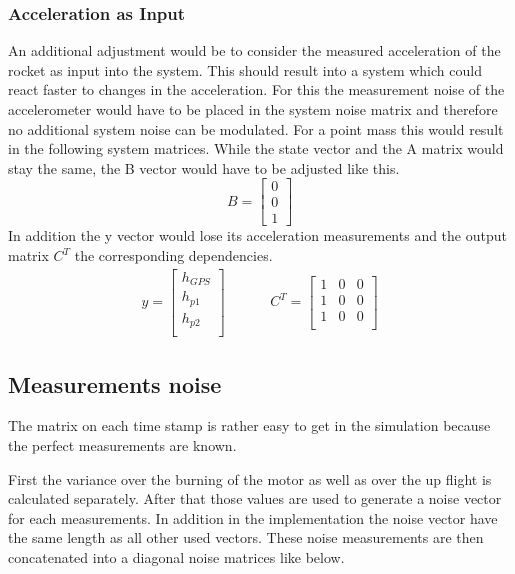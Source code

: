 \subsubsection{Acceleration as Input}
An additional adjustment would be to consider the measured acceleration of the rocket as input into the system.
This should result into a system which could react faster to changes in the acceleration.
For this the measurement noise of the accelerometer would have to be placed in the system noise matrix 
and therefore no additional system noise can be modulated.
For a point mass this would result in the following system matrices.
While the state vector and the A matrix would stay the same, the B vector would have to be adjusted like this.
$$ B = \begin{bmatrix}
        0 \\
        0 \\
        1
       \end{bmatrix}
$$
In addition the y vector would lose its acceleration measurements and the output matrix $C^T$ the corresponding dependencies.
\begin{align*}
 y = \begin{bmatrix}
      h_{GPS} \\
      h_{p1} \\
      h_{p2} \\
     \end{bmatrix}
      & \hspace{1cm}
 C^T = \begin{bmatrix}
        1 & 0 & 0 \\
        1 & 0 & 0 \\
        1 & 0 & 0 \\
       \end{bmatrix}
\end{align*}

\subsection{Measurements noise}
The matrix on each time stamp is rather easy to get in the simulation because the perfect measurements are known.

First the variance over the burning of the motor as well as over the up flight is calculated separately.
After that those values are used to generate a noise vector for each measurements.
In addition in the implementation the noise vector have the same length as all other used vectors.
These noise measurements are then concatenated into a diagonal noise matrices like below.


